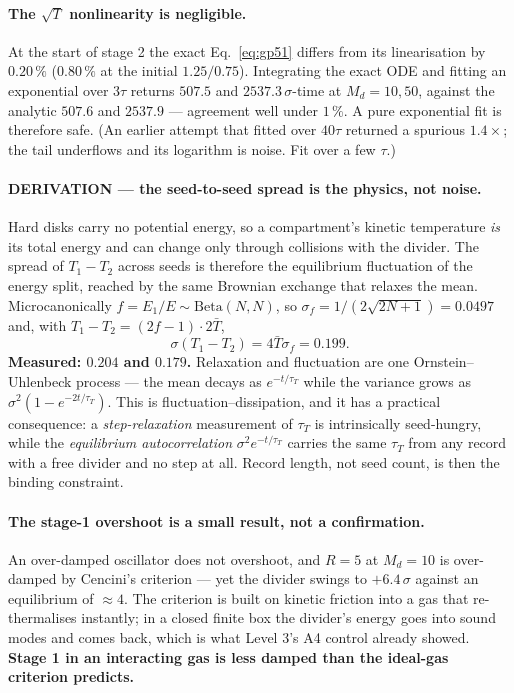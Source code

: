 \documentclass[11pt,a4paper]{article}
\begin{document}
\paragraph{The $\sqrt T$ nonlinearity is negligible.} At the start of stage 2 the exact
Eq.~\eqref{eq:gp51} differs from its linearisation by $0.20\,\%$ ($0.80\,\%$ at the initial
$1.25/0.75$). Integrating the exact ODE and fitting an exponential over $3\tau$ returns
$507.5$ and $2537.3\,\sigma$-time at $M_d = 10, 50$, against the analytic $507.6$ and $2537.9$ ---
agreement well under $1\,\%$. A pure exponential fit is therefore safe. (An earlier attempt that
fitted over $40\tau$ returned a spurious $1.4\times$; the tail underflows and its logarithm is
noise. Fit over a few $\tau$.)

\paragraph{DERIVATION --- the seed-to-seed spread is the physics, not noise.} Hard disks carry no
potential energy, so a compartment's kinetic temperature \emph{is} its total energy and can change
only through collisions with the divider. The spread of $T_1-T_2$ across seeds is therefore the
equilibrium fluctuation of the energy split, reached by the same Brownian exchange that relaxes the
mean. Microcanonically $f = E_1/E \sim \mathrm{Beta}(N,N)$, so
$\sigma_f = 1/(2\sqrt{2N+1}) = 0.0497$ and, with $T_1-T_2 = (2f-1)\cdot 2\bar T$,
\begin{equation}
\sigma(T_1-T_2) = 4\bar T\sigma_f = 0.199 .
\end{equation}
\textbf{Measured: $0.204$ and $0.179$.} Relaxation and fluctuation are one Ornstein--Uhlenbeck
process --- the mean decays as $e^{-t/\tau_T}$ while the variance grows as
$\sigma^2(1-e^{-2t/\tau_T})$. This is fluctuation--dissipation, and it has a practical consequence:
a \emph{step-relaxation} measurement of $\tau_T$ is intrinsically seed-hungry, while the
\emph{equilibrium autocorrelation} $\sigma^2 e^{-t/\tau_T}$ carries the same $\tau_T$ from any
record with a free divider and no step at all. Record length, not seed count, is then the binding
constraint.

\paragraph{The stage-1 overshoot is a small result, not a confirmation.} An over-damped oscillator
does not overshoot, and $R = 5$ at $M_d = 10$ is over-damped by Cencini's criterion --- yet the
divider swings to $+6.4\,\sigma$ against an equilibrium of $\approx 4$. The criterion is built on
kinetic friction into a gas that re-thermalises instantly; in a closed finite box the divider's
energy goes into sound modes and comes back, which is what Level 3's A4 control already showed.
\textbf{Stage 1 in an interacting gas is less damped than the ideal-gas criterion predicts.}
\end{document}
